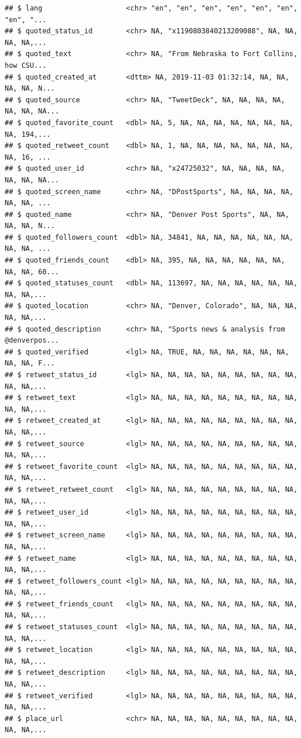 \documentclass[
]{book}
\begin{document}
\begin{verbatim}
## $ lang                    <chr> "en", "en", "en", "en", "en", "en", "en", "...
## $ quoted_status_id        <chr> NA, "x1190803840213209088", NA, NA, NA, NA,...
## $ quoted_text             <chr> NA, "From Nebraska to Fort Collins, how CSU...
## $ quoted_created_at       <dttm> NA, 2019-11-03 01:32:14, NA, NA, NA, NA, N...
## $ quoted_source           <chr> NA, "TweetDeck", NA, NA, NA, NA, NA, NA, NA...
## $ quoted_favorite_count   <dbl> NA, 5, NA, NA, NA, NA, NA, NA, NA, NA, 194,...
## $ quoted_retweet_count    <dbl> NA, 1, NA, NA, NA, NA, NA, NA, NA, NA, 16, ...
## $ quoted_user_id          <chr> NA, "x24725032", NA, NA, NA, NA, NA, NA, NA...
## $ quoted_screen_name      <chr> NA, "DPostSports", NA, NA, NA, NA, NA, NA, ...
## $ quoted_name             <chr> NA, "Denver Post Sports", NA, NA, NA, NA, N...
## $ quoted_followers_count  <dbl> NA, 34841, NA, NA, NA, NA, NA, NA, NA, NA, ...
## $ quoted_friends_count    <dbl> NA, 395, NA, NA, NA, NA, NA, NA, NA, NA, 60...
## $ quoted_statuses_count   <dbl> NA, 113697, NA, NA, NA, NA, NA, NA, NA, NA,...
## $ quoted_location         <chr> NA, "Denver, Colorado", NA, NA, NA, NA, NA,...
## $ quoted_description      <chr> NA, "Sports news & analysis from @denverpos...
## $ quoted_verified         <lgl> NA, TRUE, NA, NA, NA, NA, NA, NA, NA, NA, F...
## $ retweet_status_id       <lgl> NA, NA, NA, NA, NA, NA, NA, NA, NA, NA, NA,...
## $ retweet_text            <lgl> NA, NA, NA, NA, NA, NA, NA, NA, NA, NA, NA,...
## $ retweet_created_at      <lgl> NA, NA, NA, NA, NA, NA, NA, NA, NA, NA, NA,...
## $ retweet_source          <lgl> NA, NA, NA, NA, NA, NA, NA, NA, NA, NA, NA,...
## $ retweet_favorite_count  <lgl> NA, NA, NA, NA, NA, NA, NA, NA, NA, NA, NA,...
## $ retweet_retweet_count   <lgl> NA, NA, NA, NA, NA, NA, NA, NA, NA, NA, NA,...
## $ retweet_user_id         <lgl> NA, NA, NA, NA, NA, NA, NA, NA, NA, NA, NA,...
## $ retweet_screen_name     <lgl> NA, NA, NA, NA, NA, NA, NA, NA, NA, NA, NA,...
## $ retweet_name            <lgl> NA, NA, NA, NA, NA, NA, NA, NA, NA, NA, NA,...
## $ retweet_followers_count <lgl> NA, NA, NA, NA, NA, NA, NA, NA, NA, NA, NA,...
## $ retweet_friends_count   <lgl> NA, NA, NA, NA, NA, NA, NA, NA, NA, NA, NA,...
## $ retweet_statuses_count  <lgl> NA, NA, NA, NA, NA, NA, NA, NA, NA, NA, NA,...
## $ retweet_location        <lgl> NA, NA, NA, NA, NA, NA, NA, NA, NA, NA, NA,...
## $ retweet_description     <lgl> NA, NA, NA, NA, NA, NA, NA, NA, NA, NA, NA,...
## $ retweet_verified        <lgl> NA, NA, NA, NA, NA, NA, NA, NA, NA, NA, NA,...
## $ place_url               <chr> NA, NA, NA, NA, NA, NA, NA, NA, NA, NA, NA,...

\end{verbatim}
\end{document}
